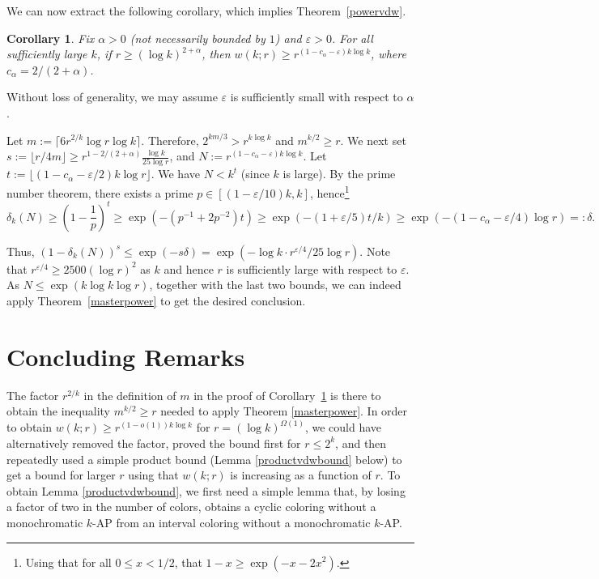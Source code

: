 \documentclass[11pt]{article}
\makeatletter
\numberwithin{equation}{section}
\renewenvironment{proof}[1][\proofname]{\par
  \vspace{-\topsep}%
  \pushQED{\qed}%
  \normalfont
  \topsep0pt \partopsep0pt %
  \trivlist
  \item[\hskip\labelsep
        \itshape
    #1\@addpunct{.}]\ignorespaces
}{%
  \popQED\endtrivlist\@endpefalse
  \addvspace{6pt plus 6pt} %
}
\newtheorem{cor}[result]{Corollary}
\theoremstyle{definition}
\theoremstyle{remark}
\makeatother
\begin{document}
We can now extract the following corollary, which implies Theorem~\ref{powervdw}.
\begin{cor}\label{lastcor}
    Fix $\alpha>0$ (not necessarily bounded by $1$) and $\varepsilon>0$. For all sufficiently large $k$, if $r\ge (\log k)^{2+\alpha}$, then $w(k;r)\ge r^{(1-c_\alpha-\varepsilon)k\log k}$, where $c_\alpha=2/(2+\alpha)$.
\end{cor}
\begin{proof}
    Without loss of generality, we may assume $\varepsilon$ is sufficiently small with respect to $\alpha$.

    Let $m:=\lceil 6 r^{2/k}\log r\log k\rceil$. Therefore, $2^{km/3}>r^{k\log k}$ and $m^{k/2}\ge r$. We next set $s:= \lfloor r/4m\rfloor \ge r^{1-2/(2+\alpha)}\frac{\log k}{25\log r}$, and $N := r^{(1-c_\alpha-\varepsilon)k\log k}$. Let $t:= \lfloor (1-c_\alpha-\varepsilon/2)k\log r \rfloor$. We have $N< k^t$ (since $k$ is large). By the prime number theorem, there exists a prime $p\in [(1-\varepsilon/10)k,k]$, hence\footnote{Using that for all $0 \leq x<1/2$, that $1-x    \ge \exp(-x-2x^2)$.} $$\delta_k(N)\ge \left(1-\frac{1}{p}\right)^t \geq \exp\left(-(p^{-1}+2p^{-2})t\right) \ge \exp\left(-(1+\varepsilon/5)t/k\right) \geq \exp(-(1-c_\alpha-\varepsilon/4)\log r)=:\delta.$$ 

Thus, $(1-\delta_k(N))^s\le \exp(-s \delta)= \exp(- \log k \cdot r^{\varepsilon/4} /25\log r)$. Note that $r^{\varepsilon /4}\ge 2500 (\log r)^2$ as $k$ and hence $r$ is sufficiently large with respect to $\varepsilon$. As $N\le \exp(k\log k\log r)$, together with the last two bounds, we can indeed apply Theorem~\ref{masterpower} to get the desired conclusion. 
\end{proof}

\section{Concluding Remarks}\label{section:conclude} 

The factor $r^{2/k}$ in the definition of $m$ in the proof of  Corollary~\ref{lastcor} is there to obtain the inequality $m^{k/2} \geq r$ needed to apply Theorem \ref{masterpower}. In order to obtain $w(k;r) \geq r^{(1-o(1))k\log k}$ for $r =(\log k)^{\Omega(1)}$, we could have alternatively removed the factor, proved the bound first for $r \leq 2^k$, and then repeatedly used a simple product bound (Lemma \ref{productvdwbound} below) to get a bound for larger $r$ using that $w(k;r)$ is increasing as a function of $r$. To obtain Lemma \ref{productvdwbound}, we first need a simple lemma that, by losing a factor of two in the number of colors, obtains a cyclic coloring without a monochromatic $k$-AP from an interval coloring without a monochromatic $k$-AP. 
\end{document}
